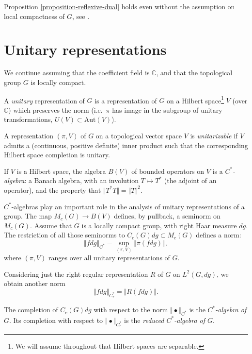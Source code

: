 \begin{remark}
\label{remark-dualcontinuous-withoutcompactness}
 Proposition  \ref{proposition-reflexive-dual}
 holds even without the assumption on local compactness of $G$, see \cite[Corollary 6.9]{Megrelishvili}.
\end{remark}




\section{Unitary representations}
\label{section-unitary-representations}

We continue assuming that the coefficient field is $\mathbb C$, and that the topological group $G$ is locally compact.


\begin{definition}
\label{definition-unitary-representation}
A {\it unitary} representation of $G$ is a representation of $G$ on a Hilbert space\footnote{We will assume throughout that Hilbert spaces are separable.} $V$ (over $\mathbb C$) which preserves the norm (i.e.\ $\pi$ has image in the subgroup of unitary transformations, $U(V)\subset \text{Aut}(V)$). 

A representation $(\pi,V)$ of $G$ on a topological vector space $V$ is {\it unitarizable} if $V$ admits a (continuous, positive definite) inner product such that the corresponding Hilbert space completion is unitary.
\end{definition}

If $V$ is a Hilbert space, the algebra $B(V)$ of bounded operators on $V$ is a {\it $C^*$-algebra}: a Banach algebra, with an involution $T\mapsto T^*$ (the adjoint of an operator), and the property that $\Vert T^*T\Vert = \Vert T\Vert^2$.

$C^*$-algebras play an important role in the analysis of unitary representations of a group. 
The map $M_c(G)\to B(V)$ defines, by pullback, a seminorm on $M_c(G)$. Assume that $G$ is a locally compact group, with right Haar measure $dg$. The restriction of all those seminorms to $C_c(G)dg\subset M_c(G)$ defines a norm:
$$ \Vert fdg \Vert_{C^*} = \sup_{(\pi,V)} \Vert \pi(fdg)\Vert,$$
where $(\pi,V)$ ranges over all unitary representations of $G$. 

Considering just the right regular representation $R$ of $G$ on $L^2(G,dg)$, we obtain another norm
$$ \Vert fdg \Vert_{C_r^*} = \Vert R(fdg)\Vert.$$

\begin{definition}
\label{definition-Cstar}
The completion of $C_c(G) dg$ with respect to the norm $\Vert\bullet\Vert_{C^*}$ is the {\it $C^*$-algebra of $G$}. Its completion with respect to $\Vert\bullet \Vert_{C_r^*}$ is the {\it reduced $C^*$-algebra of $G$}.
\end{definition}

